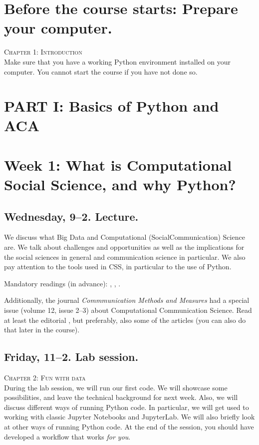 \section*{Before the course starts: Prepare your computer.}
\textsc{ Chapter 1: Introduction}\\
Make sure that you have a working Python environment installed on your computer. You cannot start the course if you have not done so.

\section*{PART I: Basics of Python and ACA}

\section*{Week 1: What is Computational Social Science, and why Python?}
\subsection*{Wednesday, 9--2. Lecture.}
We discuss what Big Data and Computational (Social\textbar Communication) Science are. We talk about challenges and opportunities as well as the implications for the social sciences in general and communication science in particular. We also pay attention to the tools used in CSS, in particular to the use of Python.

Mandatory readings (in advance):  \cite{boyd2012}, \cite{Kitchin2014}, \cite{Hilbert2019}.

Additionally, the journal \textit{Commmunication Methods and Measures} had a special issue (volume 12, issue 2--3) about Computational Communication Science. Read at least the editorial \citep{VanAtteveldt2018a}, but preferably, also some of the articles (you can also do that later in the course).


\subsection*{Friday, 11--2. Lab session.}
\textsc{ Chapter 2: Fun with data}\\

During the lab session, we will run our first code. We will showcase some possibilities, and leave the technical background for next week. Also, we will discuss different ways of running Python code. In particular, we will get used to working with classic Jupyter Notebooks and JupyterLab. We will also briefly look at other ways of running Python code. At the end of the session, you should have developed a workflow that works \emph{for you}.


